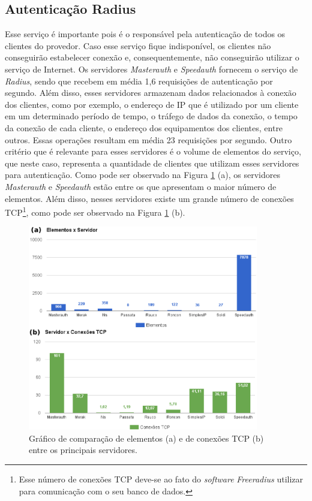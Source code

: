 \subsection{Autenticação Radius}
\label{section:radius}

Esse serviço é importante pois é o responsável pela autenticação de todos os clientes do provedor. Caso esse serviço fique indisponível, 
os clientes não conseguirão estabelecer conexão e, consequentemente, não conseguirão utilizar o serviço de Internet. Os servidores 
\textit{Masterauth} e \textit{Speedauth} fornecem o serviço de \textit{Radius}, sendo que recebem em média 1,6 requisições de autenticação 
por segundo. Além disso, esses servidores armazenam dados relacionados à conexão dos clientes, como por exemplo, o endereço de \ac{IP} que é 
utilizado por um cliente em um determinado período de tempo, o tráfego de dados da conexão, o tempo da conexão de cada cliente, o endereço 
 dos equipamentos dos clientes, entre outros. Essas operações resultam em média 23 requisições por segundo. 
Outro critério que é relevante para esses servidores é o volume de elementos do serviço, que neste caso, representa a quantidade de clientes que
utilizam esses servidores para autenticação. Como pode ser observado na Figura \ref{fig:elementos_tcp} (a), os servidores \textit{Masterauth} e 
\textit{Speedauth} estão entre os que apresentam o maior número de elementos. Além disso, nesses servidores existe um grande número de conexões 
\ac{TCP}\footnote[1]{Esse número de conexões \ac{TCP} deve-se ao fato do \textit{software} \textit{Freeradius} utilizar para comunicação com o
seu banco de dados.}, como pode ser observado na Figura \ref{fig:elementos_tcp} (b).


\begin{figure}[h!]
 \centering
 \includegraphics[width=380px]{img/elementos_tcp.eps}
 \caption{Gráfico de comparação de elementos (a) e de conexões TCP (b) entre os principais servidores.}
 \label{fig:elementos_tcp}
\end{figure}


